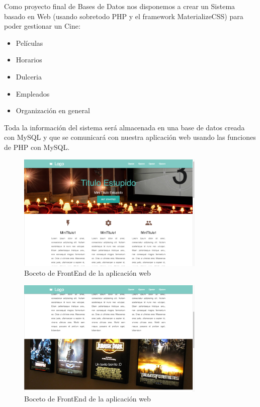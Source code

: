 \documentclass[11pt, fleqn]{article}                             %
\begin{document}
    Como proyecto final de Bases de Datos nos disponemos a crear un Sistema basado en Web 
    (usando sobretodo PHP y el framework MaterializeCSS) para poder gestionar un Cine:
    \begin{itemize}
        \item Películas
        \item Horarios
        \item Dulceria
        \item Empleados
        \item Organización en general
    \end{itemize}


    Toda la información del sistema será almacenada en una base de datos creada con MySQL
    y que se comunicará con nuestra aplicación web usando las funciones de PHP con MySQL.

    \clearpage

    \begin{figure}[h!]
        \centering
        \includegraphics[width=0.80\textwidth]{Examples0.png}
        \caption{Boceto de FrontEnd de la aplicación web}
    \end{figure}

    \begin{figure}[h!]
        \centering
        \includegraphics[width=0.80\textwidth]{Examples1.png}
        \caption{Boceto de FrontEnd de la aplicación web}
    \end{figure}
\end{document}
